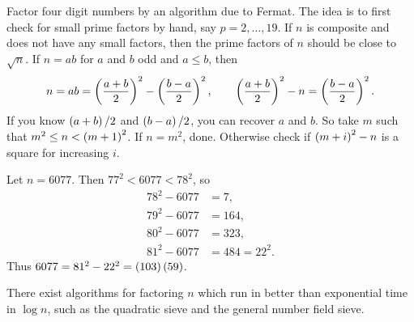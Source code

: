 Factor four digit numbers by an algorithm due to Fermat. The idea is to first check for small prime factors by hand, say $ p = 2, \dots, 19 $. If $ n $ is composite and does not have any small factors, then the prime factors of $ n $ should be close to $ \sqrt{n} $. If $ n = ab $ for $ a $ and $ b $ odd and $ a \le b $, then
$$ n = ab = \br{\dfrac{a + b}{2}}^2 - \br{\dfrac{b - a}{2}}^2, \qquad \br{\dfrac{a + b}{2}}^2 - n = \br{\dfrac{b - a}{2}}^2. $$
If you know $ \br{a + b} / 2 $ and $ \br{b - a} / 2 $, you can recover $ a $ and $ b $. So take $ m $ such that $ m^2 \le n < \br{m + 1}^2 $. If $ n = m^2 $, done. Otherwise check if $ \br{m + i}^2 - n $ is a square for increasing $ i $.

\begin{example*}
Let $ n = 6077 $. Then $ 77^2 < 6077 < 78^2 $, so
\begin{align*}
78^2 - 6077 & = 7, \\
79^2 - 6077 & = 164, \\
80^2 - 6077 & = 323, \\
81^2 - 6077 & = 484 = 22^2.
\end{align*}
Thus $ 6077 = 81^2 - 22^2 = \br{103}\br{59} $.
\end{example*}

\pagebreak

There exist algorithms for factoring $ n $ which run in better than exponential time in $ \log n $, such as the quadratic sieve and the general number field sieve.

